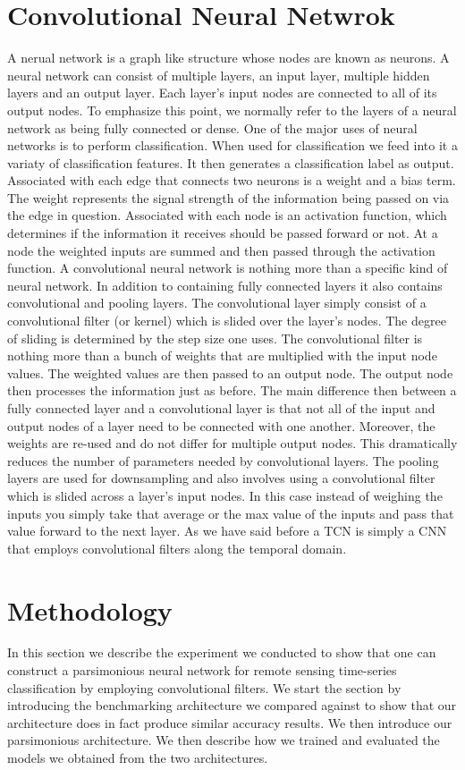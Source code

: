 \documentclass{article}
\begin{document}
 \section{Convolutional Neural Netwrok}
 A nerual network is a graph like structure whose nodes are known as neurons. A neural network can consist of multiple layers, an input layer, multiple hidden layers and an output layer. Each layer's input nodes are connected to all of its output nodes. To emphasize this point, we normally refer to the layers of a neural network as being fully connected or dense. One of the major uses of neural networks is to perform classification. When used for classification we feed into it a variaty of classification features. It then generates a classification label as output. Associated with each edge that connects two neurons is a weight and a bias term. The weight represents the signal strength of the information being passed on via the edge in question. Associated with each node is an activation function, which determines if the information it receives should be passed forward or not. At a node the weighted inputs are summed and then passed through the activation function. A convolutional neural network is nothing more than a specific kind of neural network. In addition to containing fully connected layers it also contains convolutional and pooling layers. The convolutional layer simply consist of a convolutional filter (or kernel) which is slided over the layer's nodes. The degree of sliding is determined by the step size one uses. The convolutional filter is nothing more than a bunch of weights that are multiplied with the input node values. The weighted values are then passed to an output node. The output node then processes the information just as before. The main difference then between a fully connected layer and a convolutional layer is that not all of the input and output nodes of a layer need to be connected with one another. Moreover, the weights are re-used and do not differ for multiple output nodes. This dramatically reduces the number of parameters needed by convolutional layers. The pooling layers are used for downsampling and also involves using a convolutional filter which is slided across a layer's input nodes. In this case instead of weighing the inputs you simply take that average or the max value of the inputs and pass that value forward to the next layer. As we have said before a TCN is simply a CNN that employs convolutional filters along the temporal domain.  
 
\section{Methodology}
\label{sec:exp}
In this section we describe the experiment we conducted to show that one can construct a parsimonious neural network for remote sensing time-series classification by employing convolutional filters. We start the section by introducing the benchmarking architecture we compared against to show that our architecture does in fact produce similar accuracy results. We then introduce our parsimonious architecture. We then describe how we trained and evaluated the models we obtained from the two architectures. 
\end{document}
